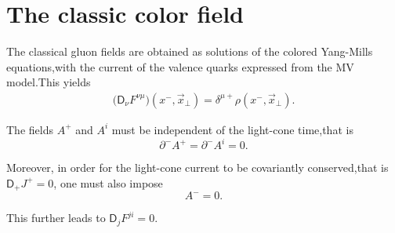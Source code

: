\section{The classic color field}
The classical gluon fields are obtained as solutions of the colored Yang-Mills equations,with the current of the valence quarks expressed from the {\sffamily MV} model.This yields
\begin{align}\label{glasma13}
    \big(\textsf{D}_\nu F^{\nu\mu}\big)(x^-,\vec{x}_\perp)=\delta^{\mu+}\rho(x^-,\vec{x}_\perp).
\end{align}

The fields $A^+$ and $A^i$ must be independent of the light-cone time,that is
\begin{equation*}
    \partial^-A^+=\partial^-A^i=0.
\end{equation*}

Moreover, in order for the light-cone current to be covariantly conserved,that is $\textsf{D}_+J^+=0$, one must also impose
\begin{equation}\label{glasma12}
    A^-=0.
\end{equation}

This further leads to $\textsf{D}_jF^{ji}=0$.



